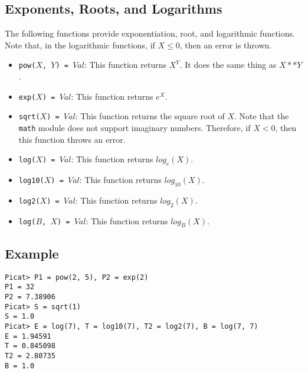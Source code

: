 \subsection{Exponents, Roots, and Logarithms}
The following functions provide exponentiation, root, and logarithmic functions.  Note that, in the logarithmic functions, if $X \le 0$, then an error is thrown.
\begin{itemize}
\item \texttt{pow($X$, $Y$) = $Val$}:  This function returns $X^Y$.  It does the same thing as $X ** Y$.
\item \texttt{exp($X$) = $Val$}:  This function returns $e^X$.
\item \texttt{sqrt($X$) = $Val$}: This function returns the square root of $X$.  Note that the \texttt{math} module does not support imaginary numbers.  Therefore, if $X < 0$, then this function throws an error.
\item \texttt{log($X$) = $Val$}: This function returns $log_e(X)$.
\item \texttt{log10($X$) = $Val$}: This function returns $log_{10}(X)$.
\item \texttt{log2($X$) = $Val$}: This function returns $log_2(X)$.
\item \texttt{log($B$, $X$) = $Val$}:  This function returns $log_B(X)$.
\end{itemize}

\subsection*{Example}
\begin{verbatim}
Picat> P1 = pow(2, 5), P2 = exp(2)
P1 = 32
P2 = 7.38906
Picat> S = sqrt(1)
S = 1.0
Picat> E = log(7), T = log10(7), T2 = log2(7), B = log(7, 7)
E = 1.94591
T = 0.845098
T2 = 2.80735
B = 1.0
\end{verbatim}

